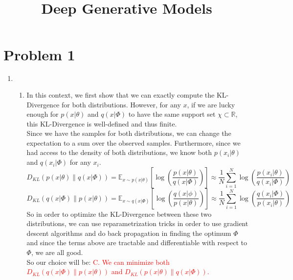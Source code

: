 \documentclass{article}
\title{Deep Generative Models \par \exerciseset}
\author{\SecondAuther }
\begin{document}
\maketitle


\section*{Problem 1}
\begin{enumerate}
    \item 
    \begin{enumerate}
        \item 
        In this context, we first show that we can exactly compute the KL-Divergence for both distributions. However, for any $x$, if we are lucky enough for $p(x|\theta)$ and $q(x|\Phi)$ to have the same support set $\chi \subset \mathbb{R}$, this KL-Divergence is well-defined and thus finite. \\
        Since we have the samples for both distributions, we can change the expectation to a sum over the observed samples. Furthermore, since 
        we had access to the density of both distributions, we know both 
        $p(x_i | \theta)$ and $q(x_i | \Phi)$ for any $x_i$.
        \begin{equation*}
            D_{KL} (p(x | \theta) \parallel q(x | \Phi)) = \mathbb{E}_{x \sim p(x | \theta)}
            \left[ \log \left( \frac{p(x | \theta)}{q(x | \Phi)} \right) \right] \approx \frac{1}{N} \sum_{i=1}^{N} \log \left( \frac{p(x_i | \theta)}{q(x_i | \Phi)} \right)
        \end{equation*}
        \begin{equation*}
            D_{KL} (q(x | \Phi) \parallel p(x | \theta)) = \mathbb{E}_{x \sim q(x | \Phi)}
            \left[ \log \left( \frac{q(x | \phi)}{p(x | \theta)} \right) \right] \approx \frac{1}{N} \sum_{i=1}^{N} \log \left( \frac{q(x_i | \Phi)}{p(x_i | \theta)} \right)
        \end{equation*}
        So in order to optimize the KL-Divergence between these two distributions, we can use reparametrization tricks in order to use gradient descent algorithms and do back propagation in finding the optimum $\Phi$ and since the terms above are tractable and differentiable with respect to $\Phi$, we are all good.\\
        So our choice will be:
        \textcolor{red}{C. We can minimize both $D_{KL} (q(x | \Phi) \parallel p(x | \theta))$ and $D_{KL} (p(x | \theta) \parallel q(x | \Phi))$.}

\end{enumerate}
\end{enumerate}
\end{document}
